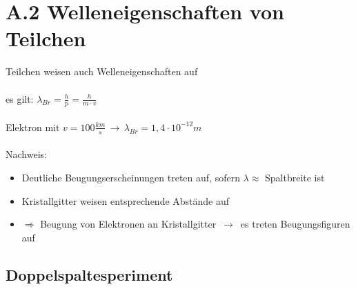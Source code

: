 \section{A.2 Welleneigenschaften von Teilchen}

Teilchen weisen auch Welleneigenschaften auf
\\
\\
es gilt: \mbox{\Large $\lambda_{Br} = \frac{h}{p} = \frac{h}{m \cdot v}$}
\\
\\
Elektron mit \mbox{\Large $ v = 100 \frac{km}{s} \,\to\, \lambda_{Br} = 1,4 \cdot 10^{-12}m$}
\\
\\
Nachweis:
{\color{red}
\begin{itemize}
    \item Deutliche Beugungserscheinungen treten auf, sofern $\lambda \approx$ Spaltbreite ist
    \item Kristallgitter weisen entsprechende Abstände auf
    \item $ \Rightarrow$ Beugung von Elektronen an Kristallgitter $\,\to\,$ es treten Beugungsfiguren auf
\end{itemize}
}
\subsection{Doppelspaltesperiment}

